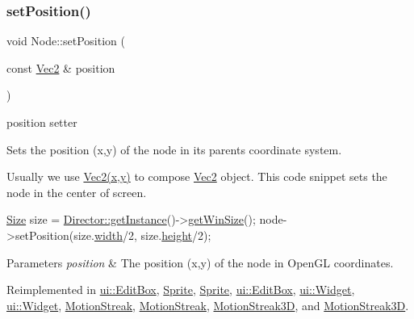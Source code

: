 \subsubsection{\texorpdfstring{set\+Position()}{setPosition()}\hspace{0.1cm}{\footnotesize\ttfamily [1/4]}}
{\footnotesize\ttfamily void Node\+::set\+Position (\begin{DoxyParamCaption}\item[{const \hyperlink{classVec2}{Vec2} \&}]{position }\end{DoxyParamCaption})\hspace{0.3cm}{\ttfamily [virtual]}}



position setter 

Sets the position (x,y) of the node in its parent\textquotesingle{}s coordinate system.

Usually we use {\ttfamily \hyperlink{classVec2}{Vec2(x,y)}} to compose \hyperlink{classVec2}{Vec2} object. This code snippet sets the node in the center of screen. 
\begin{DoxyCode}
\hyperlink{classSize}{Size} size = \hyperlink{classDirector_a8d2a4ca9e20cd400ddadd516efa111e0}{Director::getInstance}()->\hyperlink{classDirector_af07668df4a8916e6eb0f79a93f6588fe}{getWinSize}();
node->setPosition(size.\hyperlink{classSize_af0be19024ddd79e7843492b3760c21f0}{width}/2, size.\hyperlink{classSize_a880fa21eaad5a5a0fe439d440776fd05}{height}/2);
\end{DoxyCode}



\begin{DoxyParams}{Parameters}
{\em position} & The position (x,y) of the node in Open\+GL coordinates. \\
\hline
\end{DoxyParams}


Reimplemented in \hyperlink{classui_1_1EditBox_a92e525c7152c0a974632d4810b392f11}{ui\+::\+Edit\+Box}, \hyperlink{classSprite_a0c950da6338ba62938d7b2af6eea8b39}{Sprite}, \hyperlink{classSprite_aace7c480af3721709b218bdc579f8903}{Sprite}, \hyperlink{classui_1_1EditBox_a9920fc994750f83db1c80be0417143f6}{ui\+::\+Edit\+Box}, \hyperlink{classui_1_1Widget_a290404b9d89d66e9f5bc7225fe68f2b5}{ui\+::\+Widget}, \hyperlink{classui_1_1Widget_ad1983665a8a2463e77c9ff7e13fcac97}{ui\+::\+Widget}, \hyperlink{classMotionStreak_a2b77305ae80661b9508b928cf0a1699d}{Motion\+Streak}, \hyperlink{classMotionStreak_a2d7df706b1ec462093363d18fd0baf58}{Motion\+Streak}, \hyperlink{classMotionStreak3D_a070710f82d947115207e9bfc0eeb4d30}{Motion\+Streak3D}, and \hyperlink{classMotionStreak3D_a8e4698c3850e094f90600e3ba4604651}{Motion\+Streak3D}.


